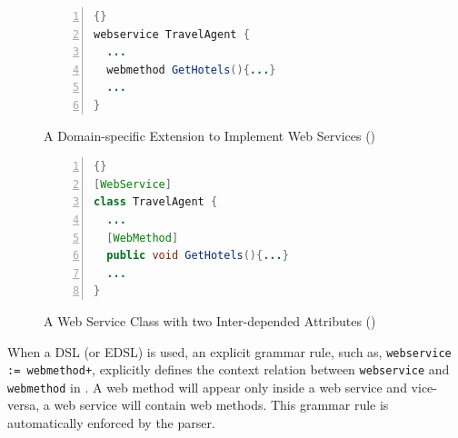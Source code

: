 \begin{figure}[ht]
\begin{minipage}[t]{0.4\linewidth}
\begin{center}
\begin{scriptsize}
\begin{lstlisting}[numbers=left,language=Java,frame=leftline]{}
webservice TravelAgent {
  ...
  webmethod GetHotels(){...}
  ...
}
\end{lstlisting}
\end{scriptsize}
\vspace{0.7cm}
\end{center}
\caption{A Domain-specific Extension to Implement Web Services ()}
\label{fig:webservice-dsl-2}\end{minipage}\hspace{1cm}%
\begin{minipage}[t]{0.4\linewidth}
\begin{center}
\begin{scriptsize}
\begin{lstlisting}[numbers=left,language=Java,frame=leftline]{}
[WebService]
class TravelAgent {
  ...
  [WebMethod]
  public void GetHotels(){...}
  ...
}
\end{lstlisting}
\end{scriptsize}
\end{center}
\caption{A Web Service Class with two Inter-depended Attributes ()}
\label{fig:webservice-2}\end{minipage}
\end{figure}

When a DSL (or EDSL) is used, an explicit grammar rule, such as, \texttt{web\-ser\-vi\-ce := web\-me\-thod+}, explicitly defines the context relation between \texttt{web\-ser\-vi\-ce} and \texttt{webme\-thod} in . 
A web method will appear only inside a web service and vice-versa, a web service will contain web methods. This grammar rule is automatically enforced by the parser.
 
